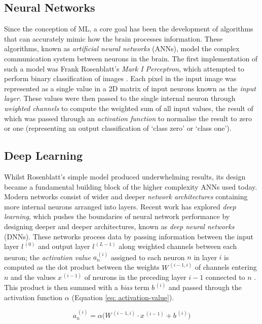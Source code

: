 \documentclass[a4paper, 11pt]{report}
\begin{document}
    \subsection{Neural Networks}

    Since the conception of ML, a core goal has been the development of algorithms that can accurately mimic how the brain processes information. These algorithms, known as \emph{artificial neural networks} (ANNs), model the complex communication system between neurons in the brain. The first implementation of such a model was Frank Rosenblatt's \emph{Mark I Perceptron}, which attempted to perform binary classification of images \citep{rosenblatt-1958}. Each pixel in the input image was represented as a single value in a 2D matrix of input neurons known as the \emph{input layer}. These values were then passed to the single internal neuron through \emph{weighted channels} to compute the weighted sum of all input values,  the result of which was passed through an \emph{activation function} to normalise the result to zero or one (representing an output classification of `class zero' or `class one'). 


    \subsection{Deep Learning}
    \label{section: deep-learning}

    Whilst Rosenblatt's simple model produced underwhelming results, its design became a fundamental building block of the higher complexity ANNs used today. Modern networks consist of wider and deeper \emph{network architectures} containing more internal neurons arranged into layers. Recent work has explored \emph{deep learning}, which pushes the boundaries of neural network performance by designing deeper and deeper architectures, known as \emph{deep neural networks} (DNNs). These networks process data by passing information between the input layer $l^{\,(0)}$ and output layer $l^{\,(L-1)}$ along weighted channels between each neuron; the \emph{activation value} $a^{\,(i)}_n$ assigned to each neuron $n$ in layer $i$ is computed as the dot product between the weights $W^{\,(i-1, i)}$ of channels entering $n$ and the values $x^{\,(i-1)}$ of neurons in the preceding layer $i-1$ connected to $n$ \citep{witten-2017}. This product is then summed with a \emph{bias} term $b^{\,(i)}$ and passed through the activation function $\alpha$ (Equation \ref{eq: activation-value}).

    \begin{equation}
        \label{eq: activation-value}
        a^{\,(i)}_n = \alpha \Big( W^{\,(i-1, i)} \cdot x^{\,(i-1)} + b^{\,(i)} \Big)
    \end{equation}
\end{document}
